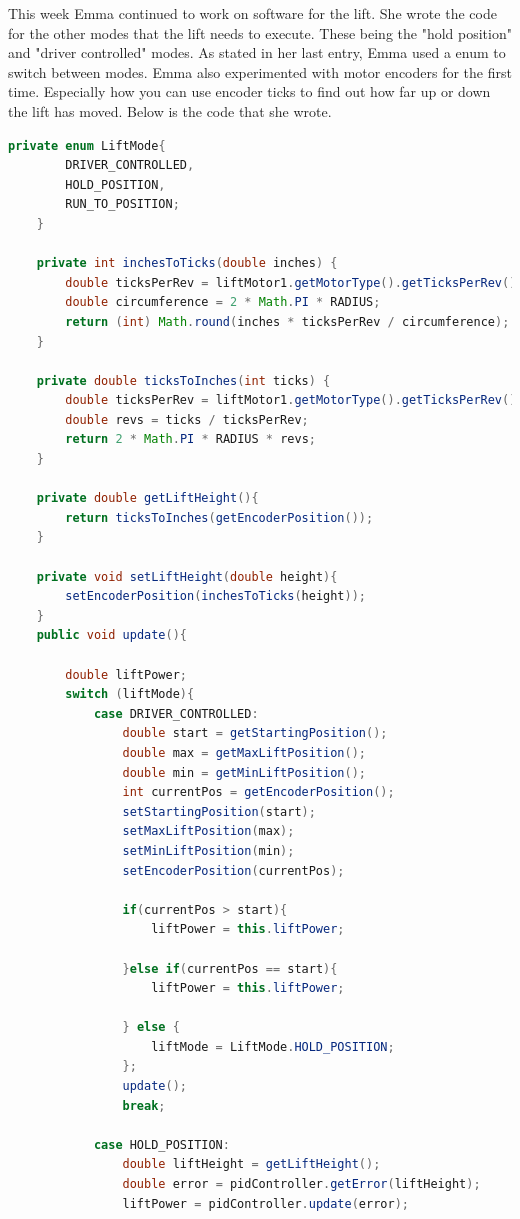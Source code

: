 \documentclass{article}
\begin{document}
This week Emma continued to work on software for the lift. She wrote the code for the other modes that the lift needs to execute. These being the "hold position" and "driver controlled" modes. As stated in her last entry, Emma used a enum to switch between modes. Emma also experimented with motor encoders for the first time. Especially how you can use encoder ticks to find out how far up or down the lift has moved. Below is the code that she wrote. 
\begin{lstlisting}[language=Java] 
    private enum LiftMode{
        DRIVER_CONTROLLED,
        HOLD_POSITION,
        RUN_TO_POSITION;
    }

    private int inchesToTicks(double inches) {
        double ticksPerRev = liftMotor1.getMotorType().getTicksPerRev();
        double circumference = 2 * Math.PI * RADIUS;
        return (int) Math.round(inches * ticksPerRev / circumference);
    }

    private double ticksToInches(int ticks) {
        double ticksPerRev = liftMotor1.getMotorType().getTicksPerRev();
        double revs = ticks / ticksPerRev;
        return 2 * Math.PI * RADIUS * revs;
    }

    private double getLiftHeight(){
        return ticksToInches(getEncoderPosition());
    }

    private void setLiftHeight(double height){
        setEncoderPosition(inchesToTicks(height));
    }
    public void update(){

        double liftPower;
        switch (liftMode){
            case DRIVER_CONTROLLED:
                double start = getStartingPosition();
                double max = getMaxLiftPosition();
                double min = getMinLiftPosition();
                int currentPos = getEncoderPosition();
                setStartingPosition(start);
                setMaxLiftPosition(max);
                setMinLiftPosition(min);
                setEncoderPosition(currentPos);

                if(currentPos > start){
                    liftPower = this.liftPower;

                }else if(currentPos == start){
                    liftPower = this.liftPower;

                } else {
                    liftMode = LiftMode.HOLD_POSITION;
                };
                update();
                break;

            case HOLD_POSITION:
                double liftHeight = getLiftHeight();
                double error = pidController.getError(liftHeight);
                liftPower = pidController.update(error);


\end{lstlisting}
\end{document}
